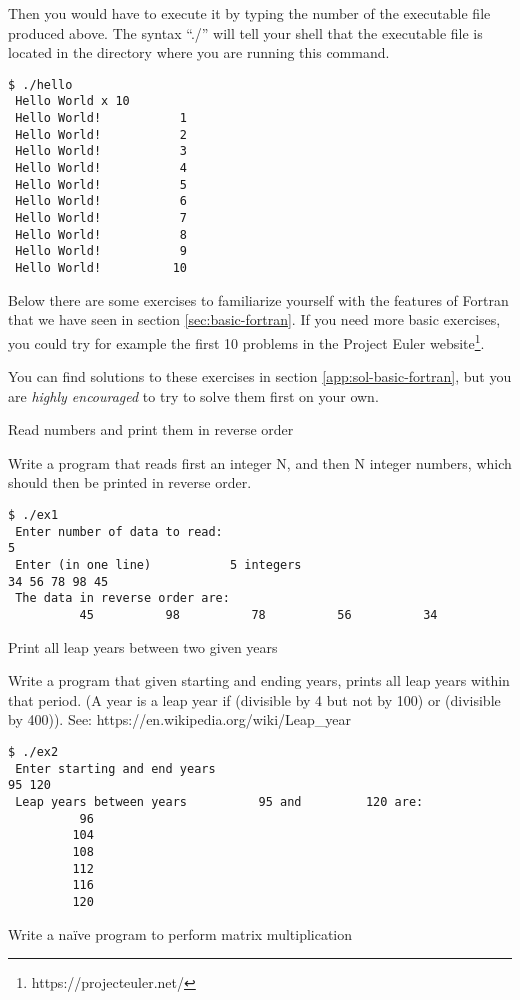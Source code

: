 Then you would have to execute it by typing the number of the executable file
produced above. The syntax ``./'' will tell your shell that the executable file
is located in the directory where you are running this command.

\begin{verbatim}
$ ./hello
 Hello World x 10
 Hello World!           1
 Hello World!           2
 Hello World!           3
 Hello World!           4
 Hello World!           5
 Hello World!           6
 Hello World!           7
 Hello World!           8
 Hello World!           9
 Hello World!          10
\end{verbatim}

Below there are some exercises to familiarize yourself with the features of
Fortran that we have seen in section \ref{sec:basic-fortran}. If you need more
basic exercises, you could try for example the first 10 problems in the Project
Euler website\footnote{https://projecteuler.net/}.

You can find solutions to these exercises in section
\ref{app:sol-basic-fortran}, but you are \emph{highly encouraged} to try to solve
them first on your own.

 {Read numbers and print them in reverse order}
\label{ex:basic-reverse}

Write a program that reads first an integer N, and then N integer numbers, which
should then be printed in reverse order.

\begin{verbatim}
$ ./ex1
 Enter number of data to read:
5
 Enter (in one line)           5 integers
34 56 78 98 45
 The data in reverse order are:
          45          98          78          56          34
\end{verbatim}

 {Print all leap years between two given years}
\label{ex:basic-leap}

Write a program that given starting and ending years, prints all leap years
within that period. (A year is a leap year if (divisible by 4 but not by 100) or
(divisible by 400)). See: https://en.wikipedia.org/wiki/Leap\_year

\begin{verbatim}
$ ./ex2
 Enter starting and end years
95 120
 Leap years between years          95 and         120 are:
          96
         104
         108
         112
         116
         120
\end{verbatim}

 {Write a naïve program to perform matrix multiplication}
\label{ex:basic-matmul}


